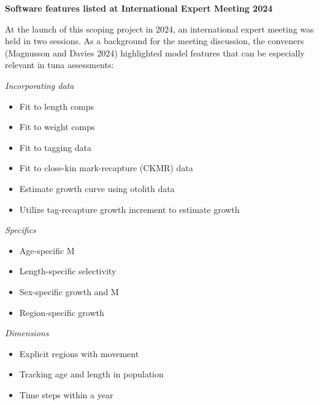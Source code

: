 \documentclass{SCreport}
\begin{document}
\newpage

\textbf{Software features listed at International Expert Meeting 2024}

At the launch of this scoping project in 2024, an international expert meeting
was held in two sessions. As a background for the meeting discussion, the
conveners (Magnusson and Davies 2024) highlighted model features that can be
especially relevant in tuna assessments:

\vspace{1ex}

\textit{Incorporating data}

\begin{itemize}
  \item Fit to length comps\\[-4.5ex]
  \item Fit to weight comps\\[-4.5ex]
  \item Fit to tagging data\\[-4.5ex]
  \item Fit to close-kin mark-recapture (CKMR) data\\[-4.5ex]
  \item Estimate growth curve using otolith data\\[-4.5ex]
  \item Utilize tag-recapture growth increment to estimate growth
\end{itemize}

\vspace{1ex}

\textit{Specifics}

\begin{itemize}
  \item Age-specific M\\[-4.5ex]
  \item Length-specific selectivity\\[-4.5ex]
  \item Sex-specific growth and M\\[-4.5ex]
  \item Region-specific growth
\end{itemize}

\vspace{1ex}

\textit{Dimensions}

\begin{itemize}
  \item Explicit regions with movement\\[-4.5ex]
  \item Tracking age and length in population\\[-4.5ex]
  \item Time steps within a year
\end{itemize}
\end{document}
